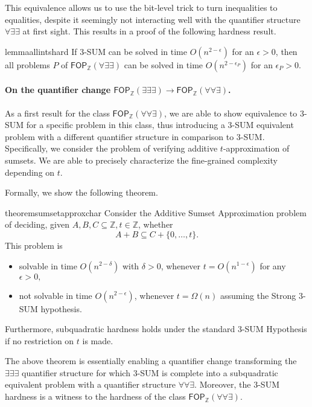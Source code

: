 This equivalence allows us to use the bit-level trick to turn inequalities to equalities, despite it seemingly not interacting well with the quantifier structure $\forall \exists \exists$ at first sight.
This results in a proof of the following hardness result.
\begin{restatable}{lemma}{allintshard}
	If $3$-SUM can be solved in time $O(n^{2-\epsilon})$ for an $\epsilon>0$,
	then all problems $P$ of $\mathsf{FOP}_{\mathbb{Z}}(\forall \exists \exists)$
	can be solved in time $O(n^{2-\epsilon_{P}})$ for an $\epsilon_{P}>0$. 
	\label{fopaee}
	\end{restatable}

\paragraph*{On the quantifier change $\mathsf{FOP}_{\mathbb{Z}}(\exists \exists \exists) \to \mathsf{FOP}_{\mathbb{Z}}(\forall \forall \exists) $.}
As a first result for the class $\mathsf{FOP}_{\mathbb{Z}}(\forall \forall \exists)$, 
we are able to show equivalence to $3$-SUM for a specific problem in this class,
thus introducing a $3$-SUM equivalent problem
with a different quantifier structure in comparison to $3$-SUM.
Specifically, we consider the problem of verifying additive $t$-approximation of sumsets.
We are able to precisely characterize the fine-grained complexity depending on $t$.

Formally, we show the following theorem.
\begin{restatable}{theorem}{sumsetapproxchar}
	Consider the Additive Sumset Approximation problem of deciding, given $A,B,C\subseteq \mathbb{Z}, t\in \mathbb{Z}$, whether
	$$A+B \subseteq C +\{0,\dots,t\}.$$
	This problem is
	\begin{itemize}
	\item solvable in time $O(n^{2-\delta})$ with $\delta>0$, whenever $t=O(n^{1-\epsilon})$ for any $\epsilon>0,$
	\item not solvable in time $O(n^{2-\epsilon})$, whenever $t =\Omega(n)$ assuming the Strong $3$-SUM hypothesis.
	\end{itemize}
	  Furthermore, subquadratic hardness holds under the standard 3-SUM Hypothesis if no restriction on $t$ is made.
	  \label{sumsetapproxTHM}
	\end{restatable}

The above theorem is essentially enabling a quantifier change transforming the $\exists \exists \exists$ quantifier structure for which $3$-SUM is complete 
into a subquadratic equivalent problem with a quantifier structure $\forall \forall \exists$.
Moreover, the $3$-SUM hardness is a witness to the hardness of the class $\mathsf{FOP}_{\mathbb{Z}}(\forall \forall \exists)$.

